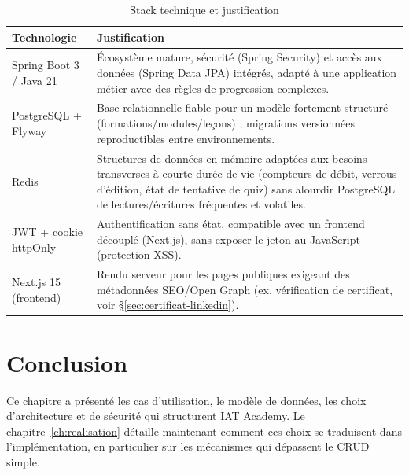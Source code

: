 \begin{table}[H]
  \centering
  \caption{Stack technique et justification}
  \label{tab:stack}
  \begin{tabular}{@{}p{3.2cm}p{9cm}@{}}
    \toprule
    Technologie & Justification \\
    \midrule
    Spring Boot 3 / Java 21 & Écosystème mature, sécurité (Spring Security)
      et accès aux données (Spring Data JPA) intégrés, adapté à une
      application métier avec des règles de progression complexes. \\
    PostgreSQL + Flyway & Base relationnelle fiable pour un modèle fortement
      structuré (formations/modules/leçons) ; migrations versionnées
      reproductibles entre environnements. \\
    Redis & Structures de données en mémoire adaptées aux besoins
      transverses à courte durée de vie (compteurs de débit, verrous
      d'édition, état de tentative de quiz) sans alourdir PostgreSQL de
      lectures/écritures fréquentes et volatiles. \\
    JWT + cookie httpOnly & Authentification sans état, compatible avec un
      frontend découplé (Next.js), sans exposer le jeton au JavaScript
      (protection XSS). \\
    Next.js 15 (frontend) & Rendu serveur pour les pages publiques exigeant
      des métadonnées SEO/Open Graph (ex. vérification de certificat, voir
      \S\ref{sec:certificat-linkedin}). \\
    \bottomrule
  \end{tabular}
\end{table}

\section{Conclusion}

Ce chapitre a présenté les cas d'utilisation, le modèle de données, les
choix d'architecture et de sécurité qui structurent IAT Academy. Le
chapitre~\ref{ch:realisation} détaille maintenant comment ces choix se
traduisent dans l'implémentation, en particulier sur les mécanismes qui
dépassent le CRUD simple.
